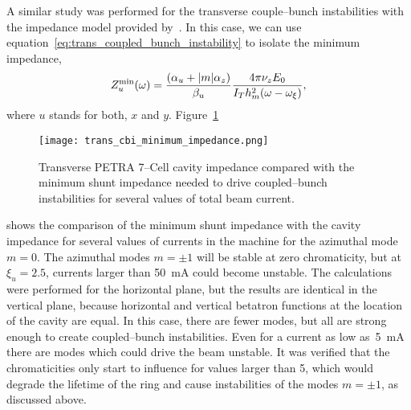     A similar study was performed for the transverse couple--bunch instabilities with the impedance model provided by~. In this case, we can use equation~\eqref{eq:trans_coupled_bunch_instability} to isolate the minimum impedance,
    \begin{align}
        Z_u^\text{min}(\omega) = \frac{\left(\alpha_u + |m|\alpha_z\right)}{\beta_u}\frac{4\pi\nu_zE_0}{I_Th_m^2(\omega-\omega_\xi)},
    \end{align}
    where $u$ stands for both, $x$ and $y$. Figure~\ref{fig:trans_cbi_minimum_impedance}
    \begin{figure}
        \centering
        \texttt{[image: trans\_cbi\_minimum\_impedance.png]}
        \caption{Transverse PETRA 7--Cell cavity impedance compared with the minimum shunt impedance needed to drive coupled--bunch instabilities for several values of  total beam current.}
        \label{fig:trans_cbi_minimum_impedance}
    \end{figure}
    shows the comparison of the minimum shunt impedance with the cavity impedance for several values of currents in the machine for the azimuthal mode $m=0$. The azimuthal modes $m=\pm1$ will be stable at zero chromaticity, but at $\xi_u = 2.5$, currents larger than \SI{50}{\milli\ampere} could become unstable. The calculations were performed for the horizontal plane, but the results are identical in the vertical plane, because horizontal and vertical betatron functions at the location of the cavity are equal. In this case, there are fewer modes, but all are strong enough to create coupled--bunch instabilities. Even for a current as low as~\SI{5}{\milli\ampere} there are modes which could drive the beam unstable. It was verified that the chromaticities only start to influence for values larger than 5, which would degrade the lifetime of the ring and cause instabilities of the modes $m=\pm1$, as discussed above.

